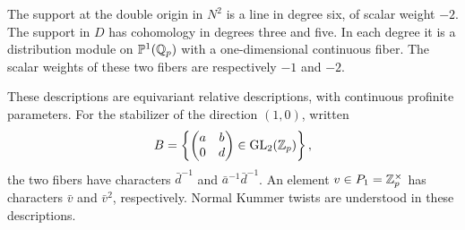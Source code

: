 \begin{lemma}\label{h3:ana:ordinary-support}
The support at the double origin in $N^2$ is a line in degree
six, of scalar weight $-2$.
The support in $D$ has cohomology in degrees three and five.
In each degree it is a distribution module on
$\mathbb P^1(\mathbb Q_p)$ with a one-dimensional continuous fiber.
The scalar weights of these two fibers are respectively
$-1$ and $-2$.

These descriptions are equivariant relative descriptions,
with continuous profinite parameters.  For the stabilizer
of the direction $(1,0)$, written
\[
 B=\left\{\begin{pmatrix}a&b\\0&d\end{pmatrix}
                \in\operatorname{GL}_2(\mathbb Z_p)\right\},
\]
the two fibers have characters $\bar d^{-1}$ and
$\bar a^{-1}\bar d^{-1}$.  An element $v\in P_1=\mathbb Z_p^\times$
has characters $\bar v$ and $\bar v^2$, respectively.
Normal Kummer twists are understood in these descriptions.
\end{lemma}
